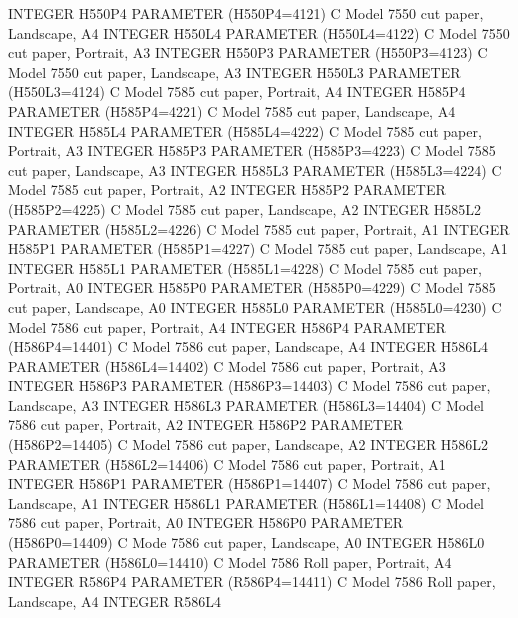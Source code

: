 \begin{XMP}
      INTEGER    H550P4
      PARAMETER (H550P4=4121)
C     Model      7550 cut paper,  Landscape,  A4
      INTEGER    H550L4
      PARAMETER (H550L4=4122)
C     Model      7550 cut paper,  Portrait,   A3
      INTEGER    H550P3
      PARAMETER (H550P3=4123)
C     Model      7550 cut paper,  Landscape,  A3
      INTEGER    H550L3
      PARAMETER (H550L3=4124)
C     Model      7585 cut paper,  Portrait,   A4
      INTEGER    H585P4
      PARAMETER (H585P4=4221)
C     Model      7585 cut paper,  Landscape,  A4
      INTEGER    H585L4
      PARAMETER (H585L4=4222)
C     Model      7585 cut paper,  Portrait,   A3
      INTEGER    H585P3
      PARAMETER (H585P3=4223)
C     Model      7585 cut paper,  Landscape,  A3
      INTEGER    H585L3
      PARAMETER (H585L3=4224)
C     Model      7585 cut paper,  Portrait,   A2
      INTEGER    H585P2
      PARAMETER (H585P2=4225)
C     Model      7585 cut paper,  Landscape,  A2
      INTEGER    H585L2
      PARAMETER (H585L2=4226)
C     Model      7585 cut paper,  Portrait,   A1
      INTEGER    H585P1
      PARAMETER (H585P1=4227)
C     Model      7585 cut paper,  Landscape,  A1
      INTEGER    H585L1
      PARAMETER (H585L1=4228)
C     Model      7585 cut paper,  Portrait,   A0
      INTEGER    H585P0
      PARAMETER (H585P0=4229)
C     Model      7585 cut paper,  Landscape,  A0
      INTEGER    H585L0
      PARAMETER (H585L0=4230)
C     Model      7586 cut paper,  Portrait,   A4
      INTEGER    H586P4
      PARAMETER (H586P4=14401)
C     Model      7586 cut paper,  Landscape,  A4
      INTEGER    H586L4
      PARAMETER (H586L4=14402)
C     Model      7586 cut paper,  Portrait,   A3
      INTEGER    H586P3
      PARAMETER (H586P3=14403)
C     Model      7586 cut paper,  Landscape,  A3
      INTEGER    H586L3
      PARAMETER (H586L3=14404)
C     Model      7586 cut paper,  Portrait,   A2
      INTEGER    H586P2
      PARAMETER (H586P2=14405)
C     Model      7586 cut paper,  Landscape,  A2
      INTEGER    H586L2
      PARAMETER (H586L2=14406)
C     Model      7586 cut paper,  Portrait,   A1
      INTEGER    H586P1
      PARAMETER (H586P1=14407)
C     Model      7586 cut paper,  Landscape,  A1
      INTEGER    H586L1
      PARAMETER (H586L1=14408)
C     Model      7586 cut paper,  Portrait,   A0
      INTEGER    H586P0
      PARAMETER (H586P0=14409)
C     Mode       7586 cut paper,  Landscape,  A0
      INTEGER    H586L0
      PARAMETER (H586L0=14410)
C     Model      7586 Roll paper, Portrait,   A4
      INTEGER    R586P4
      PARAMETER (R586P4=14411)
C     Model      7586 Roll paper, Landscape,  A4
      INTEGER    R586L4

\end{XMP}
